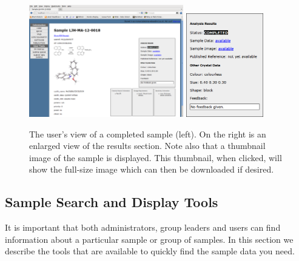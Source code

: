 \documentclass[12pt,twoside]{article}
\begin{document}
\begin{enumerate}[(i)]
\begin{figure}[!h]
\begin{center}
\includegraphics[width=0.60\textwidth]{sampleshowpage}
\quad
\includegraphics[width=0.30\textwidth]{sampleresults}
\caption{The user's view of a completed sample (left). On the right is
an enlarged view of the results section. Note also that a thumbnail image
of the sample is displayed. This thumbnail, when clicked, will show the
full-size image which can then be downloaded if desired.\label{fig:sampleshowpage}}
\end{center}
\end{figure}


\end{enumerate}

\subsection{Sample Search and Display Tools}
It is important that both administrators, group leaders and users can
find information about a particular sample or group of samples.
In this section we describe the tools that are available to quickly find
the sample data you need.
\end{document}
